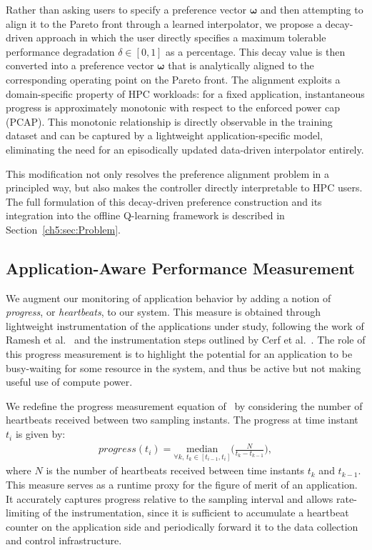 Rather than asking users to specify a preference vector $\boldsymbol{\omega}$ and then attempting to align it to the Pareto front through a learned interpolator, we propose a decay-driven approach in which the user directly specifies a maximum tolerable performance degradation $\delta \in [0,1]$ as a percentage. This decay value is then converted into a preference vector 
$\boldsymbol{\omega}$ that is analytically aligned to the corresponding operating point on the Pareto front. The alignment exploits a domain-specific property of HPC workloads: for a fixed application, instantaneous progress is approximately monotonic with respect to the enforced power cap (PCAP). This monotonic relationship is directly observable in the training dataset and can be captured by a lightweight application-specific model, eliminating the need for an episodically updated data-driven 
interpolator entirely.

This modification not only resolves the preference alignment problem in a principled way, but also makes the controller directly interpretable to HPC users. The full formulation of this decay-driven preference construction and its integration into the offline Q-learning framework is described in Section~\ref{ch5:sec:Problem}.

\subsection{Application-Aware Performance Measurement}
\label{ch5:subsec:Performance_Measurement}

We augment our monitoring of application behavior by adding a 
notion of \textit{progress}, or \textit{heartbeats}, to our 
system. This measure is obtained through lightweight 
instrumentation of the applications under study, following the 
work of Ramesh et al.~\cite{ramesh2019understanding} and the 
instrumentation steps outlined by Cerf et 
al.~\cite{rutten2021sustaining}. The role of this progress 
measurement is to highlight the potential for an application to 
be busy-waiting for some resource in the system, and thus be 
active but not making useful use of compute power.

We redefine the progress measurement equation 
of~\cite{ramesh2019understanding} by considering the number of 
heartbeats received between two sampling instants. The progress 
at time instant $t_i$ is given by:
\begin{equation}
\begin{aligned}
progress(t_i) = \underset{\forall k,\, t_k \in 
[t_{i-1},t_i]}{\text{median}}\bigg(\frac{N}{t_k - t_{k-1}} 
\bigg),
\end{aligned}
\label{ch5:eq:progress-calculation}
\end{equation}
where $N$ is the number of heartbeats received between time 
instants $t_k$ and $t_{k-1}$. This measure serves as a 
runtime proxy for the figure of merit of an application. It 
accurately captures progress relative to the sampling interval 
and allows rate-limiting of the instrumentation, since it is 
sufficient to accumulate a heartbeat counter on the application 
side and periodically forward it to the data collection and 
control infrastructure.

